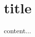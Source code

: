 \documentclass{article}
\begin{document}
\section[short title]{title}

\begin{thmrep}
content...
\end{thmrep}
\end{document}
